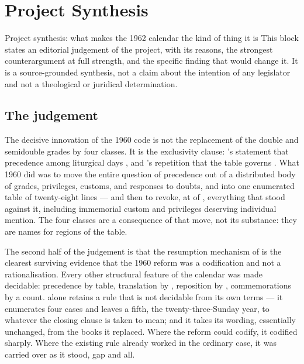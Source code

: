 \section{Project Synthesis}

\begin{studybox}{Project synthesis: what makes the 1962 calendar the kind of thing it is}
This block states an editorial judgement of the project, with its reasons, the strongest
counterargument at full strength, and the specific finding that would change it. It is a
source-grounded synthesis, not a claim about the intention of any legislator and not a
theological or juridical determination.
\end{studybox}

\subsection{The judgement}

The decisive innovation of the 1960 code is not the replacement of the double and semidouble
grades by four classes. It is the exclusivity clause: 's statement that precedence among
liturgical days , and 's repetition
that the table governs . What 1960 did was
to move the entire question of precedence out of a distributed body of grades, privileges,
customs, and responses to doubts, and into one enumerated table of twenty-eight lines — and then
to revoke, at  of , everything that stood against it,
including immemorial custom and privileges deserving individual mention. The four classes are a
consequence of that move, not its substance: they are names for regions of the table.

The second half of the judgement is that the resumption mechanism of  is the clearest
surviving evidence that the 1960 reform was a codification and not a rationalisation. Every
other structural feature of the calendar was made decidable: precedence by table, translation by
, reposition by , commemorations by a count.  alone retains a rule that is
not decidable from its own terms — it enumerates four cases and leaves a fifth, the
twenty-three-Sunday year, to whatever the closing  clause is taken to mean; and it
takes its wording, essentially unchanged, from the books it replaced. Where the reform could
codify, it codified sharply. Where the existing rule already worked in the ordinary case, it was
carried over as it stood, gap and all.

